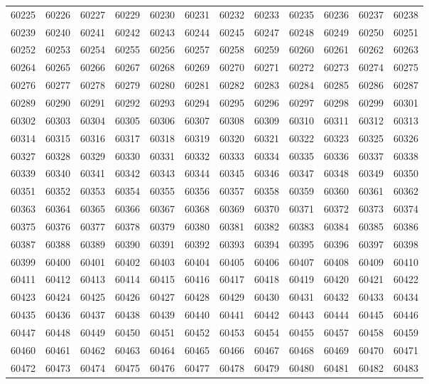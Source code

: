 \begin{center}
\begin{longtable}{llllllllllll}
60225 &60226 &60227 &60229 &60230 &60231 &60232 &60233 &60235 &60236 &60237 &60238 \\
60239 &60240 &60241 &60242 &60243 &60244 &60245 &60247 &60248 &60249 &60250 &60251 \\
60252 &60253 &60254 &60255 &60256 &60257 &60258 &60259 &60260 &60261 &60262 &60263 \\
60264 &60265 &60266 &60267 &60268 &60269 &60270 &60271 &60272 &60273 &60274 &60275 \\
60276 &60277 &60278 &60279 &60280 &60281 &60282 &60283 &60284 &60285 &60286 &60287 \\
60289 &60290 &60291 &60292 &60293 &60294 &60295 &60296 &60297 &60298 &60299 &60301 \\
60302 &60303 &60304 &60305 &60306 &60307 &60308 &60309 &60310 &60311 &60312 &60313 \\
60314 &60315 &60316 &60317 &60318 &60319 &60320 &60321 &60322 &60323 &60325 &60326 \\
60327 &60328 &60329 &60330 &60331 &60332 &60333 &60334 &60335 &60336 &60337 &60338 \\
60339 &60340 &60341 &60342 &60343 &60344 &60345 &60346 &60347 &60348 &60349 &60350 \\
60351 &60352 &60353 &60354 &60355 &60356 &60357 &60358 &60359 &60360 &60361 &60362 \\
60363 &60364 &60365 &60366 &60367 &60368 &60369 &60370 &60371 &60372 &60373 &60374 \\
60375 &60376 &60377 &60378 &60379 &60380 &60381 &60382 &60383 &60384 &60385 &60386 \\
60387 &60388 &60389 &60390 &60391 &60392 &60393 &60394 &60395 &60396 &60397 &60398 \\
60399 &60400 &60401 &60402 &60403 &60404 &60405 &60406 &60407 &60408 &60409 &60410 \\
60411 &60412 &60413 &60414 &60415 &60416 &60417 &60418 &60419 &60420 &60421 &60422 \\
60423 &60424 &60425 &60426 &60427 &60428 &60429 &60430 &60431 &60432 &60433 &60434 \\
60435 &60436 &60437 &60438 &60439 &60440 &60441 &60442 &60443 &60444 &60445 &60446 \\
60447 &60448 &60449 &60450 &60451 &60452 &60453 &60454 &60455 &60457 &60458 &60459 \\
60460 &60461 &60462 &60463 &60464 &60465 &60466 &60467 &60468 &60469 &60470 &60471 \\
60472 &60473 &60474 &60475 &60476 &60477 &60478 &60479 &60480 &60481 &60482 &60483 \\

\end{longtable}
\end{center}
